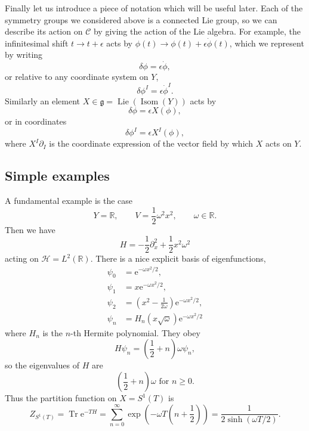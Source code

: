 \documentclass[12pt,letterpaper,reqno]{article}
\numberwithin{equation}{section}
\newcommand{\fg}{{\mathfrak g}}
\newcommand{\cC}{\ensuremath{\mathcal C}}
\newcommand{\cH}{\ensuremath{\mathcal H}}
\newcommand{\R}{\ensuremath{\mathbb R}}
\newcommand{\half}{\ensuremath{\frac{1}{2}}}
\newcommand{\e}{{\mathrm e}}
\newcommand{\eps}{\epsilon}
\DeclareMathOperator{\Tr}{Tr}
\DeclareMathOperator{\Lie}{Lie}
\DeclareMathOperator{\Isom}{Isom}
\begin{document}
Finally let us introduce a piece of notation which will be useful later. 
Each of the symmetry groups we considered above is a connected Lie group,
so we can describe its action on $\cC$ 
by giving the action of the Lie algebra.
For example, the infinitesimal shift $t \to t + \eps$ acts by
$\phi(t) \to \phi(t) + \eps \dot\phi(t)$, which we represent
by writing
\begin{equation}
	\delta \phi = \eps \dot\phi,
\end{equation}
or relative to any coordinate system on $Y$,
\begin{equation}
	\delta \phi^I = \eps \dot\phi^I.
\end{equation}
Similarly an element $X \in \fg = \Lie(\Isom(Y))$
acts by
\begin{equation}
	\delta \phi = \eps X(\phi),
\end{equation}
or in coordinates
\begin{equation}
	\delta \phi^I = \eps X^I(\phi),
\end{equation}
where $X^I \partial_I$ is the coordinate expression of the vector field
by which $X$ acts on $Y$.

\subsection{Simple examples} \label{sec:0d-simple-examples}

\begin{example} \label{exa:harmonic-oscillator}
A fundamental example is the case
\begin{equation}
  Y = \R, \qquad V = \frac12{\omega^2 x^2}, \qquad \omega \in \R.
\end{equation}
Then we have
\begin{equation}
  H = -\half \partial_x^2 + \half x^2 \omega^2
\end{equation}
acting on $\cH = L^2(\R)$.
There is a nice explicit basis of eigenfunctions,
\begin{align}
  \psi_0 &= \e^{- \omega x^2/2}, \\
  \psi_1 &= x \e^{- \omega x^2/2}, \\
  \psi_2 &= \left (x^2 - \frac{1}{2 \omega} \right) \e^{- \omega x^2/2}, \\
  \psi_n &= H_n(x \sqrt{\omega}) \e^{- \omega x^2/2}
\end{align}
where $H_n$ is the $n$-th Hermite polynomial.
They obey
\begin{equation}
  H \psi_n = \left(\half + n\right) \omega \psi_n,
\end{equation}
so the eigenvalues of $H$ are
\begin{equation}
  \left( \half + n \right) \omega \text{ for $n \ge 0$}.
\end{equation}
Thus the partition function on $X = S^1(T)$ is
\begin{equation} \label{eq:s1-z-harmonic-oscillator}
  Z_{S^1(T)} = \Tr \e^{-T H} = \sum_{n=0}^\infty \exp\left(- \omega T\left(n + \half\right)\right) = \frac{1}{2 \sinh(\omega T/2)}.
\end{equation}
\end{example}
\end{document}
